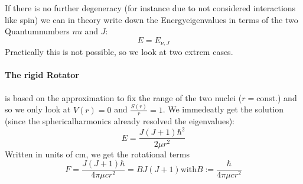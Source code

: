 If there is no further degeneracy (for instance due to not
considered interactions like spin) we can in theory write
down the Energyeigenvalues in terms of the two Quantumnumbers
$nu$ and $J$:
\begin{equation}
    E = E_{\nu,J}
\end{equation}
Practically this is not possible, so we look at two extrem cases.
\paragraph{The rigid Rotator} is based on the approximation to
fix the range of the two nuclei ($r =$const.) and so we only
look at $V(r)=0$ and $\frac{S(r)}{r} = 1$. We immedeatly get
the solution (since the sphericalharmonics already resolved
the eigenvalues):
\begin{equation}
    E = \frac{J(J+1)\hbar^2}{2\mu r^2}
\end{equation}
Written in units of $\mathrm{cm}$, we get the rotational terms
\begin{equation}
    F = \frac{J(J+1)\hbar}{4 \pi \mu c r^2} = B J (J + 1) \mathrm{with} B := \frac{\hbar}{4 \pi \mu c r^2}
\end{equation}

